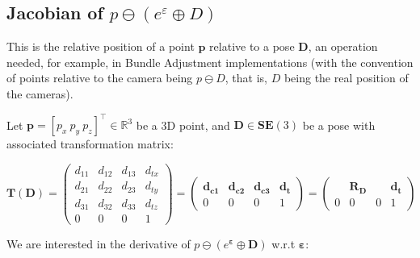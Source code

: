 \documentclass[a4paper,11pt]{report}
\newcommand{\E}{{\bm{\varepsilon}}}
\begin{document}
\subsection{Jacobian of $p \ominus (e^\varepsilon \oplus D) $}
\label{sect:jacob_eDp_inv}

This is the relative position of a point $\mathbf{p}$ relative to a pose $\mathbf{D}$,
an operation needed, for example, in Bundle Adjustment implementations \cite{triggs2000bundle}
(with the convention of points relative to the camera being $p \ominus D$, that is,
$D$ being the real position of the cameras).

Let $\mathbf{p} = [p_x ~ p_y ~ p_z]^\top \in \mathbb{R}^3$ be a 3D point, and
$\mathbf{D} \in \mathbf{SE}(3)$ be a pose with associated transformation matrix:

\begin{equation}
\mathbf{T}(\mathbf{D}) =
\left(
\begin{array}{ccc|c}
 d_{11} & d_{12} & d_{13} & d_{tx}   \\
 d_{21} & d_{22} & d_{23} & d_{ty}   \\
 d_{31} & d_{32} & d_{33} & d_{tz}   \\
\hline
  0 & 0 & 0 & 1
\end{array}
\right)
=
\left(
\begin{array}{ccc|c}
 \mathbf{d_{c1}}  & \mathbf{d_{c2}}  & \mathbf{d_{c3}}  & \mathbf{d_{t}}  \\
\hline
  0 & 0 & 0 & 1
\end{array}
\right)
=
\left(
\begin{array}{ccc|c}
   & \mathbf{R_D}  &  & \mathbf{d_{t}}  \\
\hline
  0 & 0 & 0 & 1
\end{array}
\right)
\end{equation}

We are interested in the derivative of $p \ominus (e^\E \oplus \mathbf{D})$ w.r.t $\E$:
\end{document}

